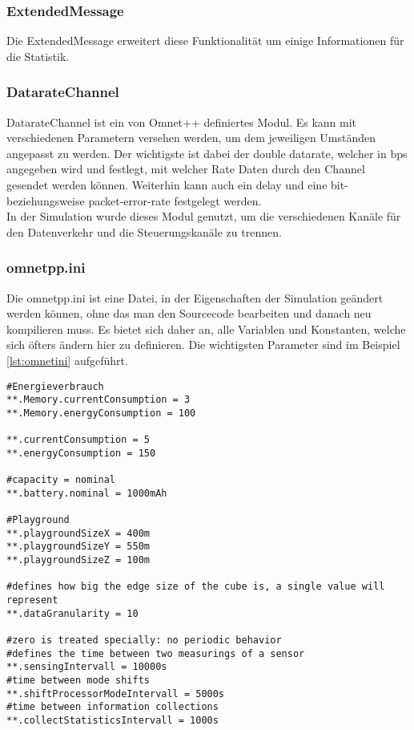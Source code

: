 \subsubsection{ExtendedMessage}

Die ExtendedMessage erweitert diese Funktionalität um einige Informationen für die Statistik.

\subsubsection{DatarateChannel}

DatarateChannel ist ein von Omnet++ definiertes Modul. Es kann mit verschiedenen Parametern versehen werden, um dem jeweiligen Umständen angepasst zu werden. Der wichtigste ist dabei der double datarate, welcher in bps angegeben wird und festlegt, mit welcher Rate Daten durch den Channel gesendet werden können. Weiterhin kann auch ein delay und eine bit- beziehungsweise packet-error-rate festgelegt werden.\\
In der Simulation wurde dieses Modul genutzt, um die verschiedenen Kanäle für den Datenverkehr und die Steuerungskanäle zu trennen.

\subsubsection{omnetpp.ini}

Die omnetpp.ini ist eine Datei, in der Eigenschaften der Simulation geändert werden können, ohne das man den Sourcecode bearbeiten und danach neu kompilieren muss. Es bietet sich daher an, alle Variablen und Konstanten, welche sich öfters ändern hier zu definieren. Die wichtigsten Parameter sind im Beispiel \ref{lst:omnetini} aufgeführt.

\begin{lstlisting}[language=ned,caption={wichtige Parameter für das ini-File},label=lst:omnetini]
#Energieverbrauch
**.Memory.currentConsumption = 3
**.Memory.energyConsumption = 100

**.currentConsumption = 5
**.energyConsumption = 150

#capacity = nominal
**.battery.nominal = 1000mAh

#Playground
**.playgroundSizeX = 400m
**.playgroundSizeY = 550m
**.playgroundSizeZ = 100m

#defines how big the edge size of the cube is, a single value will represent
**.dataGranularity = 10

#zero is treated specially: no periodic behavior
#defines the time between two measurings of a sensor
**.sensingIntervall = 10000s
#time between mode shifts
**.shiftProcessorModeIntervall = 5000s
#time between information collections
**.collectStatisticsIntervall = 1000s
\end{lstlisting}

